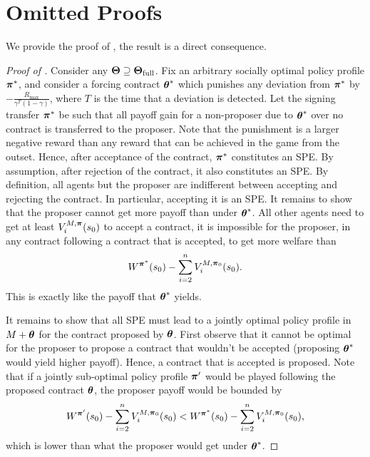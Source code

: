\clearpage 
\section{Omitted Proofs}\label{apx:proofs}
We provide the proof of , the result  is a direct consequence.
\begin{proof}[Proof of ]
Consider any ${\boldsymbol{\Theta}} \supseteq {\boldsymbol{\Theta}}_{\operatorname{\operatorname{full}}}$. Fix an arbitrary socially optimal policy profile $\boldsymbol{\pi}^*$, and consider a forcing contract ${\boldsymbol{\theta}}^*$ which punishes any deviation from $\boldsymbol{\pi}^*$ by $-\frac{R_{\text{max}}}{\gamma^T(1-\gamma)}$, where $T$ is the time that a deviation is detected. Let the signing transfer $\boldsymbol{\pi}^*$ be such that all payoff gain for a non-proposer due to $\boldsymbol{\theta}^*$ over no contract is transferred to the proposer. Note that the punishment is a larger negative reward than any reward that can be achieved in the game from the outset. Hence, after acceptance of the contract, $\boldsymbol{\pi}^*$ constitutes an SPE. By assumption, after rejection of the contract, it also constitutes an SPE. By definition, all agents but the proposer are indifferent between accepting and rejecting the contract. In particular, accepting it is an SPE. It remains to show that the proposer cannot get more payoff than under $\boldsymbol{\theta}^*$. All other agents need to get at least $V_i^{M, \boldsymbol{\pi}}(s_0)$ to accept a contract, it is impossible for the proposer, in any contract following a contract that is accepted, to get more welfare than 
\[
W^{\boldsymbol{\pi}^*}(s_0) - \sum_{i=2}^n V_i^{M, \boldsymbol{\pi}_0}(s_0).
\]
This is exactly like the payoff that $\boldsymbol{\theta}^*$ yields.

It remains to show that all SPE must lead to a jointly optimal policy profile in $M+\boldsymbol{\theta}$ for the contract proposed by $\boldsymbol{\theta}$. First observe that it cannot be optimal for the proposer to propose a contract that wouldn't be accepted (proposing $\boldsymbol{\theta}^*$ would yield higher payoff). Hence, a contract that is accepted is proposed. Note that if a jointly sub-optimal policy profile $\boldsymbol{\pi}'$ would be played following the proposed contract $\boldsymbol{\theta}$, the proposer payoff would be bounded by 
\[
W^{\boldsymbol{\pi}'}(s_0) - \sum_{i=2}^n V_i^{M, \boldsymbol{\pi}_0}(s_0) < W^{\boldsymbol{\pi}^*}(s_0) - \sum_{i=2}^n V_i^{M, \boldsymbol{\pi}_0}(s_0),
\]
which is lower than what the proposer would get under $\boldsymbol{\theta}^*$.
\end{proof}

